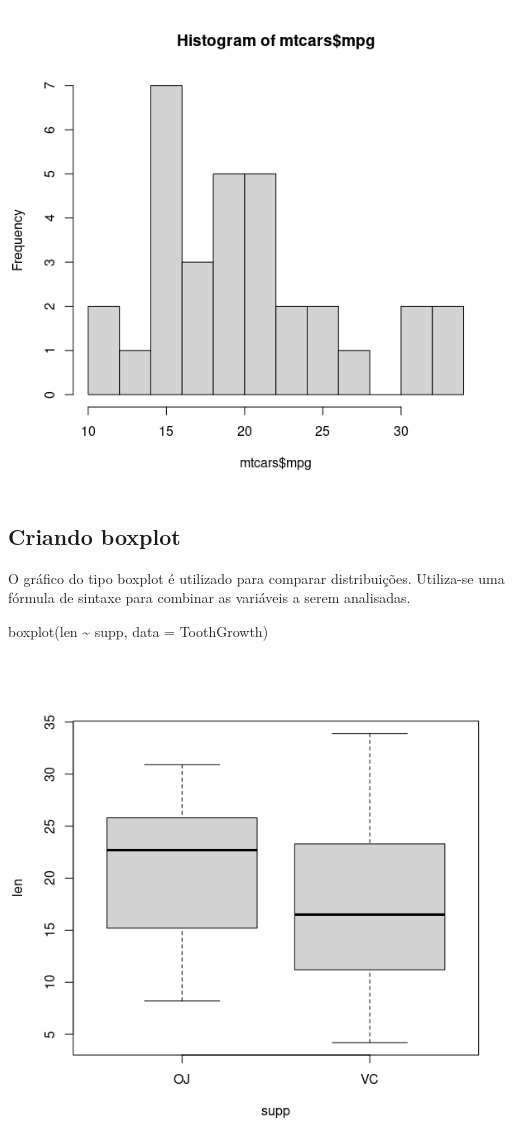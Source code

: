 \documentclass[
]{book}
\newenvironment{Shaded}{\begin{snugshade}}{\end{snugshade}}
\newcommand{\AttributeTok}[1]{\textcolor[rgb]{0.77,0.63,0.00}{#1}}
\newcommand{\FunctionTok}[1]{\textcolor[rgb]{0.00,0.00,0.00}{#1}}
\newcommand{\NormalTok}[1]{#1}
\newcommand{\SpecialCharTok}[1]{\textcolor[rgb]{0.00,0.00,0.00}{#1}}
\begin{document}
\includegraphics{figure/g8.png}

\hypertarget{criando-boxplot}{%
\subsection{Criando boxplot}\label{criando-boxplot}}

O gráfico do tipo boxplot é utilizado para comparar distribuições. Utiliza-se uma fórmula de sintaxe para combinar as variáveis a serem analisadas.

\begin{Shaded}
\begin{Highlighting}[]
\FunctionTok{boxplot}\NormalTok{(len }\SpecialCharTok{\textasciitilde{}}\NormalTok{ supp, }\AttributeTok{data =}\NormalTok{ ToothGrowth)}
\end{Highlighting}
\end{Shaded}

\includegraphics{figure/g9.png}
\end{document}
